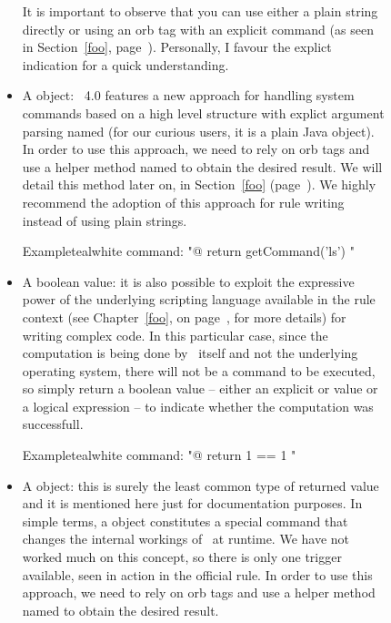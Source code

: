\begin{description}
\begin{description}
\begin{itemize}[label={--}]
It is important to observe that you can use either a plain string directly or using an orb tag with an explicit  command (as seen in Section~\ref{foo}, page~\pageref{foo}). Personally, I favour the explict indication for a quick understanding.

\item A  object: \arara\ 4.0 features a new approach for handling system commands based on a high level structure with explict argument parsing named  (for our curious users, it is a plain Java object). In order to use this approach, we need to rely on orb tags and use a helper method named  to obtain the desired result. We will detail this method later on, in Section~\ref{foo} (page~\pageref{foo}). We highly recommend the adoption of this approach for rule writing instead of using plain strings.

\begin{codebox}{Example}{teal}{\icnote}{white}
command: "@{ return getCommand('ls') }"
\end{codebox}

\item A boolean value: it is also possible to exploit the expressive power of the underlying scripting language available in the rule context (see Chapter~\ref{foo}, on page~\pageref{foo}, for more details) for writing complex code. In this particular case, since the computation is being done by \arara\ itself and not the underlying operating system, there will not be a command to be executed, so simply return a boolean value -- either an explicit  or  value or a logical expression -- to indicate whether the computation was successfull.

\begin{codebox}{Example}{teal}{\icnote}{white}
command: "@{ return 1 == 1 }"
\end{codebox}

\item A  object: this is surely the least common type of returned value and it is mentioned here just for documentation purposes. In simple terms, a  object constitutes a special command that changes the internal workings of \arara\ at runtime. We have not worked much on this concept, so there is only one trigger available, seen in action in the official  rule. In order to use this approach, we need to rely on orb tags and use a helper method named  to obtain the desired result.
\end{itemize}


\end{description}
\end{description}

